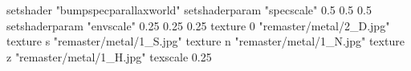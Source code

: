 setshader "bumpspecparallaxworld"
setshaderparam "specscale" 0.5 0.5 0.5
setshaderparam "envscale"  0.25 0.25 0.25
    texture 0 "remaster/metal/2_D.jpg"
    texture s "remaster/metal/1_S.jpg"
    texture n "remaster/metal/1_N.jpg"
    texture z "remaster/metal/1_H.jpg"
    texscale 0.25